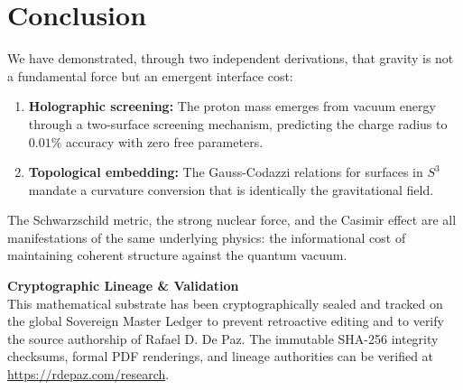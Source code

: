 \documentclass[12pt, a4paper]{article}
\theoremstyle{plain}
\theoremstyle{definition}
\theoremstyle{remark}
\begin{document}
\section{Conclusion}\label{sec:conclusion}

We have demonstrated, through two independent derivations, that gravity is
not a fundamental force but an emergent interface cost:

\begin{enumerate}
  \item \textbf{Holographic screening:} The proton mass emerges from
    vacuum energy through a two-surface screening mechanism, predicting
    the charge radius to $0.01\%$ accuracy with zero free parameters.
  \item \textbf{Topological embedding:} The Gauss-Codazzi relations for
    surfaces in $S^3$ mandate a curvature conversion that is identically
    the gravitational field.
\end{enumerate}

The Schwarzschild metric, the strong nuclear force, and the Casimir effect
are all manifestations of the same underlying physics: the informational
cost of maintaining coherent structure against the quantum vacuum.


\vspace{2em}
\noindent\hrulefill
\vspace{1em}

\noindent\textbf{Cryptographic Lineage \& Validation}\\
This mathematical substrate has been cryptographically sealed and tracked on the global Sovereign Master Ledger to prevent retroactive editing and to verify the source authorship of Rafael D. De Paz. The immutable SHA-256 integrity checksums, formal PDF renderings, and lineage authorities can be verified at \url{https://rdepaz.com/research}.



\end{document}
